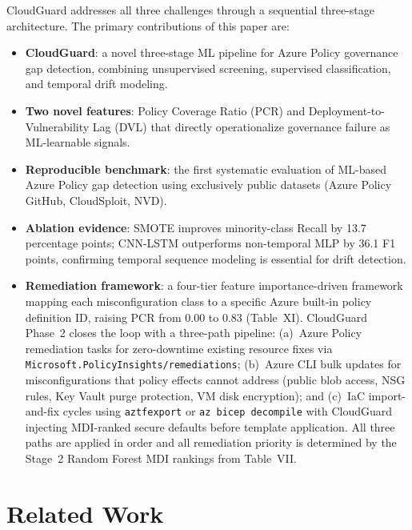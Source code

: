 \documentclass[conference]{IEEEtran}
\begin{document}
CloudGuard addresses all three challenges through a sequential 
three-stage architecture. The primary contributions of this paper are:

\begin{itemize}
  \item \textbf{CloudGuard}: a novel three-stage ML pipeline for Azure 
  Policy governance gap detection, combining unsupervised screening, 
  supervised classification, and temporal drift modeling.

  \item \textbf{Two novel features}: Policy Coverage Ratio (PCR) and 
  Deployment-to-Vulnerability Lag (DVL) that directly operationalize 
  governance failure as ML-learnable signals.

  \item \textbf{Reproducible benchmark}: the first systematic 
  evaluation of ML-based Azure Policy gap detection using exclusively 
  public datasets (Azure Policy GitHub, CloudSploit, NVD).

  \item \textbf{Ablation evidence}: SMOTE improves minority-class 
  Recall by 13.7 percentage points; CNN-LSTM outperforms non-temporal 
  MLP by 36.1 F1 points, confirming temporal sequence modeling is 
  essential for drift detection.

  \item \textbf{Remediation framework}: a four-tier feature 
  importance-driven framework mapping each misconfiguration class to a 
  specific Azure built-in policy definition ID, raising PCR from 0.00 
  to 0.83 (Table~XI). CloudGuard Phase~2 closes the loop with a 
  three-path pipeline: (a)~Azure Policy remediation tasks for 
  zero-downtime existing resource fixes via 
  \texttt{Microsoft.PolicyInsights/remediations}; (b)~Azure CLI bulk 
  updates for misconfigurations that policy effects cannot address 
  (public blob access, NSG rules, Key Vault purge protection, VM disk 
  encryption); and (c)~IaC import-and-fix cycles using 
  \texttt{aztfexport} or \texttt{az bicep decompile} with CloudGuard 
  injecting MDI-ranked secure defaults before template application. All 
  three paths are applied in order and all remediation priority is 
  determined by the Stage~2 Random Forest MDI rankings from Table~VII.
\end{itemize}

\section{Related Work}
\end{document}
